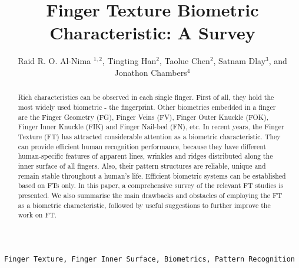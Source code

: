 \documentclass[review]{elsarticle}
\begin{document}
\begin{frontmatter}
	
	\title{Finger Texture Biometric Characteristic: A Survey}

\author{Raid R. O. Al-Nima $^{1,2}$, Tingting Han$^{2}$, Taolue Chen$^{2}$, Satnam Dlay$^{3}$, and Jonathon Chambers$^{4}$}
\address{$^{1}$ Technical Engineering College of Mosul, \\Northern Technical University, Mosul, Iraq\\
raidrafi1@gmail.com}
\address{$^{2}$ Department of Computer Science and Information Systems, \\Birkbeck, University of London, London, UK\\
tingting@dcs.bbk.ac.uk, and t.chen@dcs.bbk.ac.uk}
\address{$^{3}$ School of Engineering, Newcastle University, \\Newcastle upon Tyne, UK\\
satnam.dlay@ncl.ac.uk}
\address{$^{4}$ Department of Engineering, University of Leicester \\Leicester, UK\\
Jonathon.Chambers@le.ac.uk}

\begin{abstract}
	Rich characteristics can be observed in each single finger. First of all, they hold the most widely used biometric - the fingerprint. Other biometrics embedded in a finger are the Finger Geometry (FG), Finger Veins (FV), Finger Outer Knuckle (FOK), Finger Inner Knuckle (FIK) and Finger Nail-bed (FN), etc. In recent years, the Finger Texture (FT) has attracted considerable attention as a biometric characteristic. They can provide efficient human recognition performance, because they have different human-specific features of apparent lines, wrinkles and ridges distributed along the inner surface of all fingers. Also, their pattern structures are reliable, unique and remain stable throughout a human's life. Efficient biometric systems can be established based on FTs only. In this paper, a comprehensive survey of the relevant FT studies is presented. We also summarise the main drawbacks and obstacles of employing the FT as a biometric characteristic, followed by useful suggestions to further improve the work on FT. 
\end{abstract}

\begin{keyword}
	\texttt{Finger Texture, Finger Inner Surface, Biometrics, Pattern Recognition}
\end{keyword}

\end{frontmatter}
\end{document}
